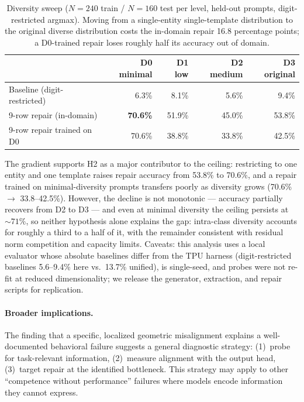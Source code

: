 \documentclass{article}
\begin{document}
\begin{table}[h]
\centering\small
\begin{tabular}{lrrrr}
\toprule
& D0 minimal & D1 low & D2 medium & D3 original \\
\midrule
Baseline (digit-restricted) & 6.3\% & 8.1\% & 5.6\% & 9.4\% \\
9-row repair (in-domain) & \textbf{70.6\%} & 51.9\% & 45.0\% & 53.8\% \\
9-row repair trained on D0 & 70.6\% & 38.8\% & 33.8\% & 42.5\% \\
\bottomrule
\end{tabular}
\caption{Diversity sweep ($N{=}240$ train / $N{=}160$ test per level, held-out prompts, digit-restricted argmax). Moving from a single-entity single-template distribution to the original diverse distribution costs the in-domain repair 16.8 percentage points; a D0-trained repair loses roughly half its accuracy out of domain.}
\label{tab:diversity}
\end{table}

The gradient supports H2 as a major contributor to the ceiling: restricting to one entity and one template raises repair accuracy from 53.8\% to 70.6\%, and a repair trained on minimal-diversity prompts transfers poorly as diversity grows (70.6\% $\to$ 33.8--42.5\%). However, the decline is not monotonic --- accuracy partially recovers from D2 to D3 --- and even at minimal diversity the ceiling persists at ${\sim}71\%$, so neither hypothesis alone explains the gap: intra-class diversity accounts for roughly a third to a half of it, with the remainder consistent with residual norm competition and capacity limits. Caveats: this analysis uses a local evaluator whose absolute baselines differ from the TPU harness (digit-restricted baselines 5.6--9.4\% here vs.\ 13.7\% unified), is single-seed, and probes were not re-fit at reduced dimensionality; we release the generator, extraction, and repair scripts for replication.

\paragraph{Broader implications.}
The finding that a specific, localized geometric misalignment explains a
well-documented behavioral failure suggests a general diagnostic strategy:
(1)~probe for task-relevant information, (2)~measure alignment with the output
head, (3)~target repair at the identified bottleneck. This strategy may apply
to other ``competence without performance'' failures where models encode
information they cannot express.
\end{document}
